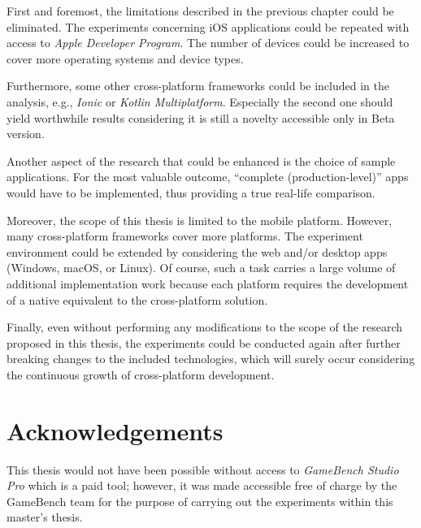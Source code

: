 First and foremost, the limitations described in the previous chapter could be eliminated. The experiments concerning iOS applications could be repeated with access to \emph{Apple Developer Program}. The number of devices could be increased to cover more operating systems and device types.

Furthermore, some other cross-platform frameworks could be included in the analysis, e.g., \emph{Ionic} or \emph{Kotlin Multiplatform}. Especially the second one should yield worthwhile results considering it is still a novelty accessible only in Beta version.

Another aspect of the research that could be enhanced is the choice of sample applications. For the most valuable outcome, ``complete (production-level)'' apps would have to be implemented, thus providing a true real-life comparison.

Moreover, the scope of this thesis is limited to the mobile platform. However, many cross-platform frameworks cover more platforms. The experiment environment could be extended by considering the web and/or desktop apps (Windows, macOS, or Linux). Of course, such a task carries a large volume of additional implementation work because each platform requires the development of a native equivalent to the cross-platform solution.

Finally, even without performing any modifications to the scope of the research proposed in this thesis, the experiments could be conducted again after further breaking changes to the included technologies, which will surely occur considering the continuous growth of cross-platform development.

\section{Acknowledgements}

This thesis would not have been possible without access to \emph{GameBench Studio Pro} which is a paid tool; however, it was made accessible free of charge by the GameBench team for the purpose of carrying out the experiments within this master's thesis.

\clearpage

